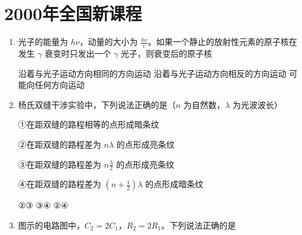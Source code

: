 \documentclass[\gkver]{gaokaozhenti}
\begin{document}
\chapter{2000年全国新课程}

\begin{enumerate}
\item
光子的能量为 $h\nu$，动量的大小为 $\frac{h\nu}{c}$。如果一个静止的放射性元素的原子核在发生 $\gamma$ 衰变时只发出一个 $\gamma$ 光子，则衰变后的原子核

{沿着与光子运动方向相同的方向运动}
{沿着与光子运动方向相反的方向运动}
{可能向任何方向运动}


\item
杨氏双缝干涉实验中，下列说法正确的是（$n$ 为自然数，$\lambda$ 为光波波长）

①在距双缝的路程相等的点形成暗条纹

②在距双缝的路程差为 $n\lambda$ 的点形成亮条纹

③在距双缝的路程差为 $n\frac{\lambda}{2}$ 的点形成亮条纹

④在距双缝的路程差为 $\left(n+\frac{1}{2}\right)\lambda$ 的点形成暗条纹

{②③}
{③④}
{②④}


\item
图示的电路图中，$C_{2}=2C_{1}$，$R_{2}=2R_{1}$。下列说法正确的是


\end{enumerate}
\end{document}
